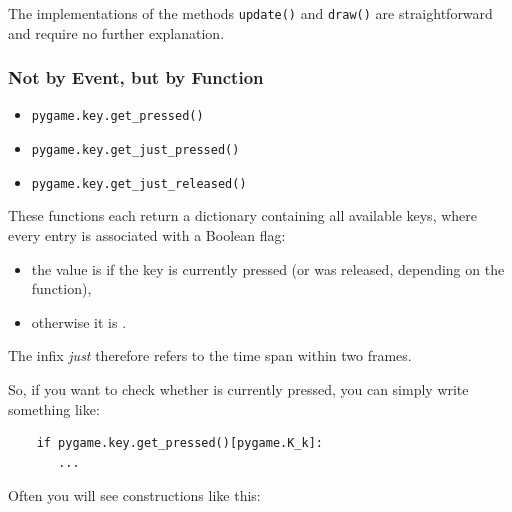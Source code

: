 
The implementations of the methods \texttt{update()} and \texttt{draw()} are straightforward and require no further explanation.

\newpage
{}


\subsubsection{Not by Event, but by Function}\label{secKeyPressed}
\begin{hintbox}
\begin{itemize}
	\item \texttt{pygame.key.get\_pressed()}
	\item \texttt{pygame.key.get\_just\_pressed()}
	\item \texttt{pygame.key.get\_just\_released()}
\end{itemize}
\end{hintbox}
These functions each return a dictionary containing all available keys, where every entry is associated with a Boolean flag:

\begin{itemize}
	\item the value is \true{} if the key is currently pressed (or was released, depending on the function),
	
	\item otherwise it is \false.
\end{itemize}

The \gls{infix} \emph{just} therefore refers to the time span within two frames.

So, if you want to check whether  is currently pressed, you can simply write something like:

\lstset{firstnumber=1}
\begin{lstlisting}
	if pygame.key.get_pressed()[pygame.K_k]:
	   ...
\end{lstlisting}

Often you will see constructions like this:

